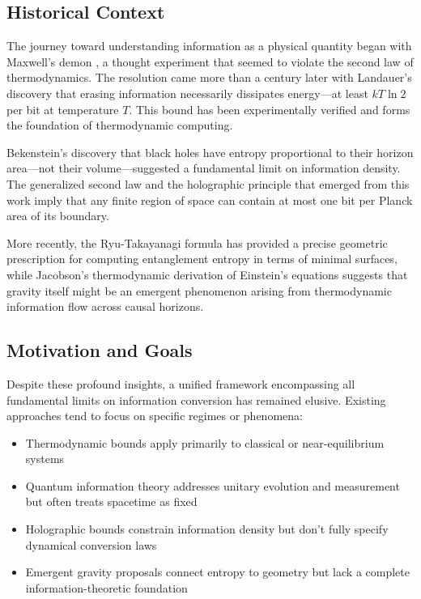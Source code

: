 \documentclass[11pt,a4paper]{article}
\theoremstyle{plain}
\theoremstyle{definition}
\theoremstyle{remark}
\begin{document}
\subsection{Historical Context}

The journey toward understanding information as a physical quantity began with Maxwell's demon \cite{maxwell1871theory}, a thought experiment that seemed to violate the second law of thermodynamics. The resolution came more than a century later with Landauer's discovery \cite{landauer1961irreversibility} that erasing information necessarily dissipates energy—at least $kT\ln 2$ per bit at temperature $T$. This bound has been experimentally verified \cite{berut2012experimental} and forms the foundation of thermodynamic computing.

Bekenstein's discovery \cite{bekenstein1973black} that black holes have entropy proportional to their horizon area—not their volume—suggested a fundamental limit on information density. The generalized second law and the holographic principle that emerged from this work \cite{thooft1993dimensional,susskind1995world} imply that any finite region of space can contain at most one bit per Planck area of its boundary.

More recently, the Ryu-Takayanagi formula \cite{ryu2006holographic} has provided a precise geometric prescription for computing entanglement entropy in terms of minimal surfaces, while Jacobson's thermodynamic derivation \cite{jacobson1995thermodynamics} of Einstein's equations suggests that gravity itself might be an emergent phenomenon arising from thermodynamic information flow across causal horizons.

\subsection{Motivation and Goals}

Despite these profound insights, a unified framework encompassing all fundamental limits on information conversion has remained elusive. Existing approaches tend to focus on specific regimes or phenomena:

\begin{itemize}[leftmargin=*]
\item Thermodynamic bounds apply primarily to classical or near-equilibrium systems
\item Quantum information theory addresses unitary evolution and measurement but often treats spacetime as fixed
\item Holographic bounds constrain information density but don't fully specify dynamical conversion laws
\item Emergent gravity proposals connect entropy to geometry but lack a complete information-theoretic foundation
\end{itemize}
\end{document}
